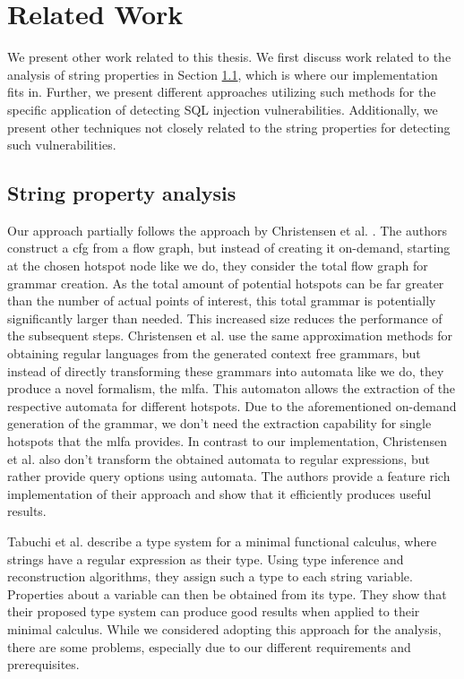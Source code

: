 \chapter{Related Work}
\label{chapter:RelatedWork}

We present other work related to this thesis. We first discuss work related to the analysis of string properties in Section \ref{sec:related:stringproperty}, which is where our implementation fits in. Further, we present different approaches utilizing such methods for the specific application of detecting SQL injection vulnerabilities. Additionally, we present other techniques not closely related to the string properties for detecting such vulnerabilities.


\section{String property analysis}\label{sec:related:stringproperty}

Our approach partially follows the approach by Christensen et al. \cite{brics}. The authors construct a \acl{cfg} from a flow graph, but instead of creating it on-demand, starting at the chosen hotspot node like we do, they consider the total flow graph for grammar creation.
As the total amount of potential hotspots can be far greater than the number of actual points of interest, this total grammar is potentially significantly larger than needed. This increased size reduces the performance of the subsequent steps.
Christensen et al. use the same approximation methods for obtaining regular languages from the generated context free grammars, but instead of directly transforming these grammars into automata like we do, they produce a novel formalism, the \ac{mlfa}.
This automaton allows the extraction of the respective automata for different hotspots. Due to the aforementioned on-demand generation of the grammar, we don't need the extraction capability for single hotspots that the \ac{mlfa} provides. In contrast to our implementation, Christensen et al. also don't transform the obtained automata to regular expressions, but rather provide query options using automata.
The authors provide a feature rich implementation of their approach and show that it efficiently produces useful results.

Tabuchi et al. \cite{regex_types} describe a type system for a minimal functional calculus, where strings have a regular expression as their type. Using type inference and reconstruction algorithms, they assign such a type to each string variable. Properties about a variable can then be obtained from its type.
They show that their proposed type system can produce good results when applied to their minimal calculus. While we considered adopting this approach for the analysis, there are some problems, especially due to our different requirements and prerequisites. 

